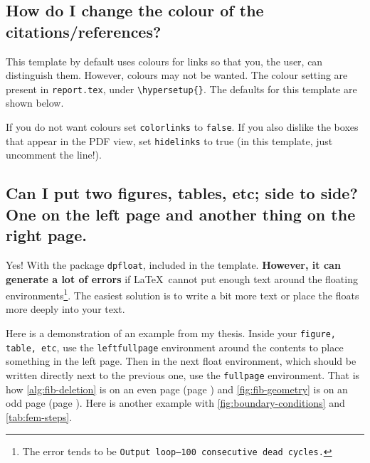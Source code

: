 \subsection{How do I change the colour of the citations/references?}

This template by default uses colours for links so that you, the user, can distinguish them. However, colours may not be wanted. The colour setting are present in \texttt{report.tex}, under \verb|\hypersetup{}|. The defaults for this template are shown below.

If you do not want colours set \verb|colorlinks| to \verb|false|. If you also dislike the boxes that appear in the PDF view, set \verb|hidelinks| to true (in this template, just uncomment the line!).

\begin{TeXlstlisting}
\hypersetup{
	colorlinks = true, %
	citecolor = red,
	urlcolor = blue,
	linkcolor = red,
} %
\end{TeXlstlisting}

\subsection[Can I put two figures, tables, etc; side to side?]{Can I put two figures, tables, etc; side to side? One on the left page and another thing on the right page.}

Yes! With the package \verb|dpfloat|, included in the template. \textbf{However, it can generate a lot of errors} if \LaTeX\ cannot put enough text around the floating environments\footnote{The error tends to be \texttt{Output loop---100 consecutive dead cycles.}}. The easiest solution is to write a bit more text or place the floats more deeply into your text.

Here is a demonstration of an example from my thesis. Inside your \texttt{figure, table, etc}, use the \verb|leftfullpage| environment around the contents to place something in the left page. Then in the next float environment, which should be written directly next to the previous one, use the \verb|fullpage| environment. That is how \cref{alg:fib-deletion} is on an even page (page \pageref{alg:fib-deletion}) and \cref{fig:fib-geometry} is on an odd page (page \pageref{fig:fib-geometry}). Here is another example with \cref{fig:boundary-conditions} and \cref{tab:fem-steps}.

